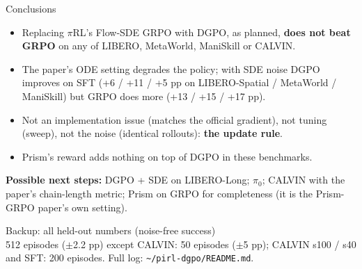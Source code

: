 \documentclass[aspectratio=169,11pt]{beamer}
\newcommand{\pirl}{$\pi$RL}
\newcommand{\pizero}{$\pi_0$}
\begin{document}
\begin{frame}{Conclusions}
  \begin{itemize}
    \item Replacing \pirl's Flow-SDE GRPO with DGPO, as planned, \textbf{does not beat GRPO} on any of
          LIBERO, MetaWorld, ManiSkill or CALVIN.
    \item The paper's ODE setting degrades the policy; with SDE noise DGPO improves on SFT
          (+6 / +11 / +5 pp on LIBERO-Spatial / MetaWorld / ManiSkill) but GRPO does more
          (+13 / +15 / +17 pp).
    \item Not an implementation issue (matches the official gradient), not tuning (sweep), not the
          noise (identical rollouts): \textbf{the update rule}.
    \item Prism's reward adds nothing on top of DGPO in these benchmarks.
  \end{itemize}
  \vspace{0.5em}
  \textbf{Possible next steps:} DGPO + SDE on LIBERO-Long; \pizero; CALVIN with the paper's chain-length
  metric; Prism on GRPO for completeness (it is the Prism-GRPO paper's own setting).
\end{frame}

\appendix
\begin{frame}{Backup: all held-out numbers (noise-free success)}
  \scriptsize
  \\[0.6em]
  {\scriptsize\textcolor{ink2}{512 episodes ($\pm$2.2 pp) except CALVIN: 50 episodes ($\pm$5 pp); CALVIN s100 / s40 and SFT: 200 episodes.
  Full log: \texttt{\textasciitilde/pirl-dgpo/README.md}.}}
\end{frame}
\end{document}
